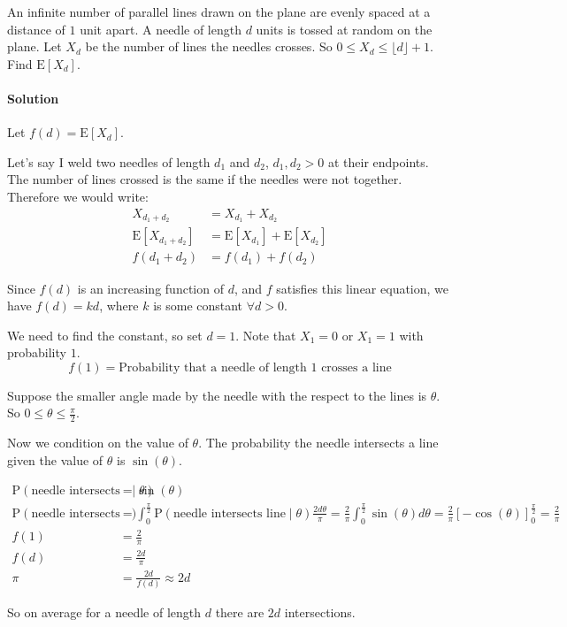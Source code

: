 \documentclass[english,12pt]{article}
\theoremstyle{plain}
\theoremstyle{definition}
\theoremstyle{definition} %
\newcommand{\ex}[1]{\mbox{E} \left[ #1 \right]}
\begin{document}
An infinite number of parallel lines drawn on the plane are evenly spaced at a distance of $1$ unit apart.  A needle of length $d$ units is tossed at random on the plane.  Let $X_d$ be the number of lines the needles crosses.  So $0\le X_d\le \lfloor d\rfloor+1$.  Find $\ex{X_d}$.

\paragraph{Solution}
Let $f(d)=\ex{X_d}$.

Let's say I weld two needles of length $d_1$ and $d_2$, $d_1,d_2>0$ at their endpoints.  The number of lines crossed is the same if the needles were not together.  Therefore we would write:
\begin{align*}
X_{d_1+d_2}&=X_{d_1}+X_{d_2}\\
\ex{X_{d_1+d_2}}&=\ex{X_{d_1}}+\ex{X_{d_2}}\\
f(d_1+d_2)&=f(d_1)+f(d_2)
\end{align*}

Since $f(d)$ is an increasing function of $d$, and $f$ satisfies this linear equation, we have $f(d)=kd$, where $k$ is some constant $\forall d>0$.

We need to find the constant, so set $d=1$.  Note that $X_1=0$ or $X_1=1$ with probability $1$.
\[f(1)=\text{Probability that a needle of length 1 crosses a line}\]

Suppose the smaller angle made by the needle with the respect to the lines is $\theta$.  So $0\le\theta\le\frac{\pi}{2}$.

Now we condition on the value of $\theta$.  The probability the needle intersects a line given the value of $\theta$ is $\sin(\theta)$.

\begin{align*}
\text{P}(\text{needle intersects line}\mid\theta)&=\sin(\theta)\\
\text{P}(\text{needle intersects line})&=\int_0^\frac{\pi}{2}\text{P}(\text{needle intersects line}\mid\theta)\frac{2d\theta}{\pi}
=\frac{2}{\pi}\int_0^\frac{\pi}{2}\sin(\theta)d\theta
=\frac{2}{\pi}\left[-\cos(\theta)\right]_0^\frac{\pi}{2}
=\frac{2}{\pi}\\
f(1)&=\frac{2}{\pi}\\
f(d)&=\frac{2d}{\pi}\\
\pi&=\frac{2d}{f(d)}
\approx 2d
\end{align*}

So on average for a needle of length $d$ there are $2d$ intersections.
\end{document}
